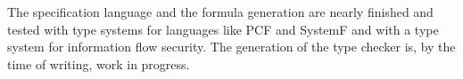 \documentclass{acm_proc_article-sp}
\begin{document}
The specification language and the formula generation are nearly
finished and tested with type systems for languages like PCF and
SystemF and with a type system for information flow security. The
generation of the type checker is, by the time of writing, work in
progress.
{} 
\end{document}

